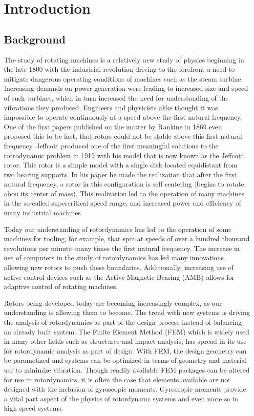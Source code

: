 \chapter{Introduction}
\section{Background} 
The study of rotating machines is a relatively new study of physics beginning in the late 1800 with the industrial revolution driving to the forefront a need to mitigate dangerous operating conditions of machines such as the steam turbine. Increasing demands on power generation were leading to increased size and speed of such turbines, which in turn increased the need for understanding of the vibrations they produced. Engineers and physicists alike thought it was impossible to operate continuously at a speed above the first natural frequency. One of the first papers published on the matter by Rankine in 1869 even proposed this to be fact, that rotors could not be stable above this first natural frequency. Jeffcott produced one of the first meaningful solutions to the rotrodynamic problem in 1919 with his model that is now known as the Jeffcott rotor. This rotor is a simple model with a single disk located equidistant from two bearing supports. In his paper he made the realization that after the first natural frequency, a rotor in this configuration is self centering (begins to rotate abou its center of mass). This realization led to the operation of many machines in the so-called supercritical speed range, and increased power and efficiency of many industrial machines.\par 
Today our understanding of rotordynamics has led to the operation of some  machines for tooling, for example, that spin at speeds of over a hundred thousand revolutions per minute--many times the first natural frequency. The increase in use of computers in the study of rotordynamics has led many innovations allowing new rotors to push these boundaries. Additionally, increasing use of active control devices such as the Active Magnetic Bearing (AMB) allows for adaptive control of rotating machines.\par 
Rotors being developed today are becoming increasingly complex, as our understanding is allowing them to become. The trend with new systems is driving the analysis of rotordynamics as part of the design process instead of balancing an already built system. The Finite Element Method (FEM) which is widely used in many other fields such as structures and impact analysis, has spread in its use for rotordynamic analysis as part of design. With FEM, the design geometry can be parametized and systems can be optimized in terms of geometry and material use to minimize vibration. Though readily available FEM packages can be altered for use in rotordynamics, it is often the case that elements available are not designed with the inclusion of gyroscopic moments. Gyroscopic moments provide a vital part aspect of the physics of rotordynamc systems and even more so in high speed systems.\par 
